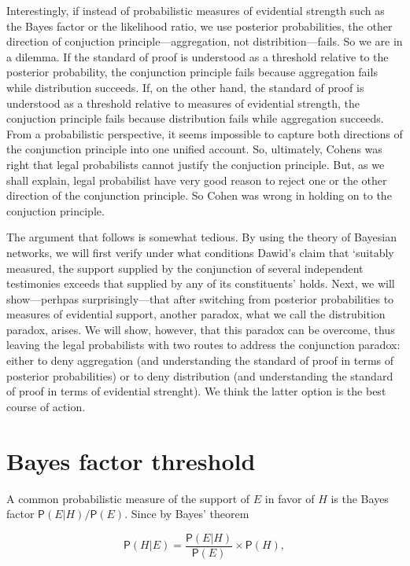 \documentclass[10pt,dvipsnames,enabledeprecatedfontcommands]{scrartcl}
\newcommand{\pr}[1]{\mathsf{P}(#1)}
\begin{document}
Interestingly, if instead of probabilistic measures of evidential
strength such as the Bayes factor or the likelihood ratio, we use
posterior probabilities, the other direction of conjuction
principle---aggregation, not distribition---fails. So we are in a
dilemma. If the standard of proof is understood as a threshold relative
to the posterior probability, the conjunction principle fails because
aggregation fails while distribution succeeds. If, on the other hand,
the standard of proof is understood as a threshold relative to measures
of evidential strength, the conjuction principle fails because
distribution fails while aggregation succeeds. From a probabilistic
perspective, it seems impossible to capture both directions of the
conjunction principle into one unified account. So, ultimately, Cohens
was right that legal probabilists cannot justify the conjuction
principle. But, as we shall explain, legal probabilist have very good
reason to reject one or the other direction of the conjunction
principle. So Cohen was wrong in holding on to the conjuction principle.

The argument that follows is somewhat tedious. By using the theory of
Bayesian networks, we will first verify under what conditions Dawid's
claim that `suitably measured, the support supplied by the conjunction
of several independent testimonies exceeds that supplied by any of its
constituents' holds. Next, we will show---perhpas surprisingly---that
after switching from posterior probabilities to measures of evidential
support, another paradox, what we call the distrubition paradox, arises.
We will show, however, that this paradox can be overcome, thus leaving
the legal probabilists with two routes to address the conjunction
paradox: either to deny aggregation (and understanding the standard of
proof in terms of posterior probabilities) or to deny distribution (and
understanding the standard of proof in terms of evidential strenght). We
think the latter option is the best course of action.

\hypertarget{bayes-factor-threshold}{%
\section{Bayes factor threshold}\label{bayes-factor-threshold}}

A common probabilistic measure of the support of \(E\) in favor of \(H\)
is the Bayes factor \(\pr{E \vert H}/\pr{E}\). Since by Bayes' theorem

\[\pr{H \vert E} = \frac{\pr{E \vert H}}{\pr{E}}\times \pr{H},\]
\end{document}
